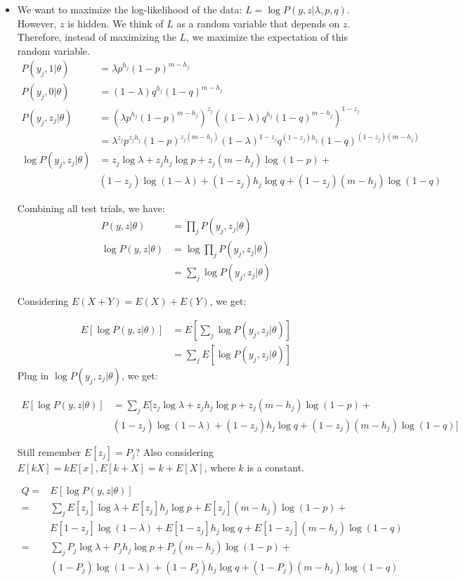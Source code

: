\documentclass{article}  %
\begin{document}
\begin{itemize}
\item We want to maximize the log-likelihood of the data: $L=\log
P(y,z|\lambda,p,q)$. However, $z$ is hidden. We think of $L$ as a random variable that depends on $z$. Therefore, instead of maximizing the $L$, we maximize the expectation of this random variable.
\begin{align*}
P(y_j,1|\theta) &= \lambda p^{h_j}(1-p)^{m-h_j}\\
P(y_j,0|\theta) &= (1-\lambda) q^{h_j}(1-q)^{m-h_j}\\
P(y_j,z_j|\theta) &= \left( \lambda p^{h_j}(1-p)^{m-h_j}\right)^{z_j}
\left((1-\lambda) q^{h_j}(1-q)^{m-h_j}\right)^{1-z_j}\\
                                         &= \lambda ^{z_j} p^{z_jh_j}(1-p)^{z_j(m-h_j)} (1-\lambda)^{1-z_j}q^{(1-z_j)h_j}(1-q)^{(1-z_j)(m-h_j)}\\
\log P(y_j,z_j|\theta) &= z_j\log\lambda + z_jh_j\log p + z_j(m-h_j)\log (1-p) +
\\
& (1-z_j)\log (1-\lambda) + (1-z_j)h_j\log q + (1-z_j)(m-h_j)\log(1-q)
\end{align*} 

Combining all test trials, we have:
\begin{align*}
P(y,z|\theta) &= \prod _j P(y_j,z_j|\theta)\\
\log P(y,z|\theta) &= \log \prod _j P(y_j,z_j|\theta)\\
 &= \sum _j \log P(y_j, z_j|\theta)
\end{align*}

Considering $E(X+Y) = E(X) + E(Y)$, we get:

\begin{align*}
E\left[\log P(y,z|\theta) \right]&= E\left[\sum_j \log P(y_j,
z_j|\theta)\right]\\
&= \sum_j E\left[\log P(y_j, z_j|\theta)\right]
\end{align*}
Plug in $\log P(y_j, z_j|\theta)$, we get:

\begin{align*}
E\left[\log P(y,z|\theta) \right]&= \sum_j E [z_j\log\lambda + z_jh_j\log p +
z_j(m-h_j)\log (1-p) + \\
& (1-z_j)\log (1-\lambda) + (1-z_j)h_j\log q + (1-z_j)(m-h_j)\log(1-q)]
\end{align*}

Still remember $E[z_j] = P_j$? Also considering $E[kX] = kE[x], E[k+X] = k +
E[X]$, where $k$ is a constant.

\begin{align*}
Q= &E\left[\log P(y,z|\theta) \right]\\
= &\sum_j E[z_j]\log\lambda + E[z_j]h_j\log p + E[z_j](m-h_j)\log (1-p) + \\
& E[1-z_j]\log (1-\lambda) + E[1-z_j]h_j\log q + E[1-z_j](m-h_j)\log(1-q)\\
= &\sum_j P_j\log\lambda + P_jh_j\log p + P_j(m-h_j)\log (1-p) + \\
& (1-P_j)\log (1-\lambda) + (1-P_j)h_j\log q + (1-P_j)(m-h_j)\log(1-q)\\
\end{align*}


\end{itemize}
\end{document}
